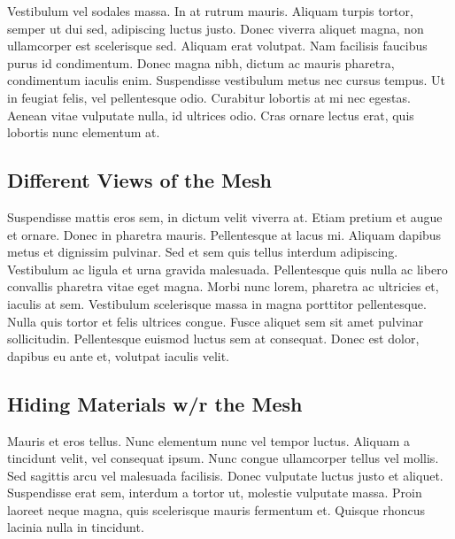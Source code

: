 \label{section:DisplayingMeshes}
Vestibulum vel sodales massa. In at rutrum mauris. Aliquam turpis tortor, semper ut dui sed, adipiscing luctus justo. Donec viverra aliquet magna, non ullamcorper est scelerisque sed. Aliquam erat volutpat. Nam facilisis faucibus purus id condimentum. Donec magna nibh, dictum ac mauris pharetra, condimentum iaculis enim. Suspendisse vestibulum metus nec cursus tempus. Ut in feugiat felis, vel pellentesque odio. Curabitur lobortis at mi nec egestas. Aenean vitae vulputate nulla, id ultrices odio. Cras ornare lectus erat, quis lobortis nunc elementum at.

\subsection{Different Views of the Mesh}
Suspendisse mattis eros sem, in dictum velit viverra at. Etiam pretium et augue et ornare. Donec in pharetra mauris. Pellentesque at lacus mi. Aliquam dapibus metus et dignissim pulvinar. Sed et sem quis tellus interdum adipiscing. Vestibulum ac ligula et urna gravida malesuada. Pellentesque quis nulla ac libero convallis pharetra vitae eget magna. Morbi nunc lorem, pharetra ac ultricies et, iaculis at sem. Vestibulum scelerisque massa in magna porttitor pellentesque. Nulla quis tortor et felis ultrices congue. Fusce aliquet sem sit amet pulvinar sollicitudin. Pellentesque euismod luctus sem at consequat. Donec est dolor, dapibus eu ante et, volutpat iaculis velit.

\subsection{Hiding Materials w/r the Mesh}
Mauris et eros tellus. Nunc elementum nunc vel tempor luctus. Aliquam a tincidunt velit, vel consequat ipsum. Nunc congue ullamcorper tellus vel mollis. Sed sagittis arcu vel malesuada facilisis. Donec vulputate luctus justo et aliquet. Suspendisse erat sem, interdum a tortor ut, molestie vulputate massa. Proin laoreet neque magna, quis scelerisque mauris fermentum et. Quisque rhoncus lacinia nulla in tincidunt.